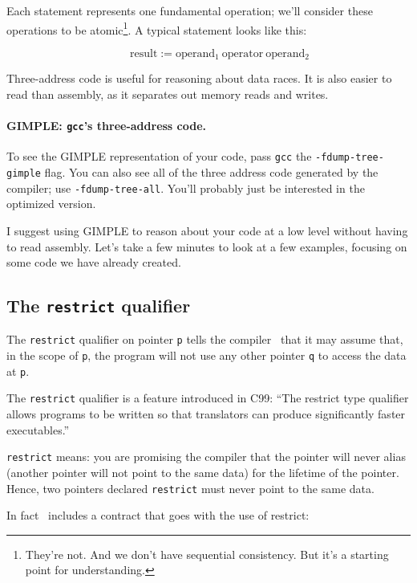 \documentclass[a4paper]{report}
\begin{document}
Each statement represents one fundamental operation; we'll consider
these operations to be atomic\footnote{They're not. And we don't have sequential consistency. But it's a starting point for understanding.}. A typical statement looks like this:

\[ \qquad \mbox{result} := \mbox{operand$_1$}\:\mbox{operator}\:\mbox{operand$_2$} \]

Three-address code is useful for reasoning about data races. It is
also easier to read than assembly, as it separates out memory reads
and writes.

\paragraph{GIMPLE: \texttt{gcc}'s three-address code.} To see the GIMPLE representation 
of your code, pass {\tt gcc} the {\tt -fdump-tree-gimple} flag. You
can also see all of the three address code generated by the compiler;
use {\tt -fdump-tree-all}. You'll probably just be interested in the
optimized version.  

I suggest using GIMPLE to reason about your code at a low level
without having to read assembly. Let's take a few minutes to look at a few examples, focusing on some code we have already created.


\subsection*{The {\tt restrict} qualifier} 
The {\tt restrict} qualifier on pointer {\tt p} tells
the compiler~\cite{cellperf} that it may assume that, in the scope of {\tt p},
the program will not use any other pointer {\tt q} to access the
data at {\tt *p}.

The {\tt restrict} qualifier is a feature introduced in C99: ``The
restrict type qualifier allows programs to be written so that
translators can produce significantly faster executables.''

{\tt restrict} means: you are promising the
compiler that the pointer will never alias (another pointer will not
point to the same data) for the lifetime of the pointer.  Hence, two
pointers declared {\tt restrict} must never point to the same data.

In fact~\cite{cellperf} includes a contract that goes with the use of restrict:
\end{document}
